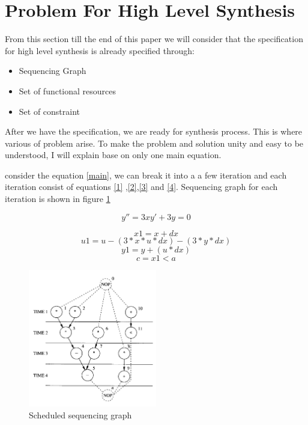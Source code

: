 \section{Problem For High Level Synthesis}

From this section till the end of this paper we will consider that the specification for high level synthesis is already specified through:

\begin{itemize}
\item Sequencing Graph
\item Set of functional resources
\item Set of constraint
\end{itemize}

After we have the specification, we are ready for synthesis process. This is where various of problem arise. To make the problem and solution unity and easy to be understood, I will explain base on only one main equation. 

consider the equation \ref{main}, we can break it into a a few iteration and each iteration consist of equations \ref{1} ,\ref{2},\ref{3} and \ref{4}. Sequencing graph for each iteration is shown in figure \ref{fig:Scheduled_sequencing_graph}

\begin{equation}\label{main}
 y'' = 3xy'+ 3y =0
\end{equation}

\begin{equation}\label{1}
 x1=x+dx
\end{equation}
\begin{equation}\label{2}
u1 = u -(3*x*u*dx)-(3*y*dx)
\end{equation}
\begin{equation}\label{3}
 y1 =y+(u*dx)
\end{equation}
\begin{equation}\label{4}
 c = x1<a
\end{equation}


\begin{figure}[h]
    \centering
    \includegraphics[width=0.5\textwidth]{scheduled_sequencing_graph}
    \caption{ Scheduled sequencing graph \cite{b1}}
    \label{fig:Scheduled_sequencing_graph}
\end{figure}

